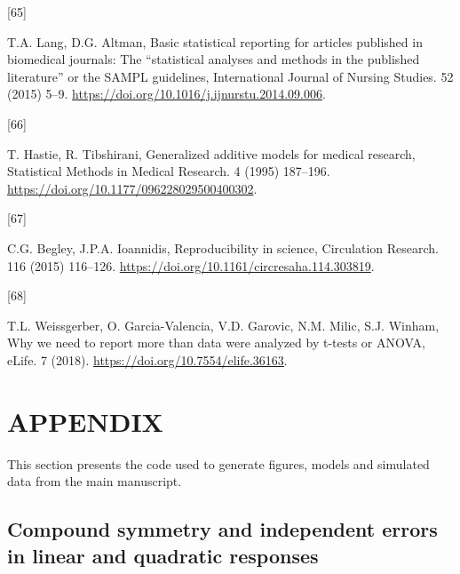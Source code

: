 \documentclass[
]{article}
\newlength{\cslhangindent}
\newlength{\csllabelwidth}
\newlength{\cslentryspacingunit} %
\newenvironment{CSLReferences}[2] %
 {%
  \setlength{\parindent}{0pt}
  \ifodd #1
  \let\oldpar\par
  \def\par{\hangindent=\cslhangindent\oldpar}
  \fi
  \setlength{\parskip}{#2\cslentryspacingunit}
 }%
 {}
\newcommand{\CSLLeftMargin}[1]{\parbox[t]{\csllabelwidth}{#1}}
\newcommand{\CSLRightInline}[1]{\parbox[t]{\linewidth - \csllabelwidth}{#1}\break}
\newcommand{\appendixpagenumbering}{
  \break
  \pagenumbering{arabic}
  \renewcommand{\thepage}{\thesection-\arabic{page}}
}
\begin{document}
\begin{CSLReferences}{0}{0}
\leavevmode{}%
\CSLLeftMargin{{[}65{]} }
\CSLRightInline{T.A. Lang, D.G. Altman, Basic statistical reporting for articles published in biomedical journals: The {``}statistical analyses and methods in the published literature{''} or the {SAMPL} guidelines, International Journal of Nursing Studies. 52 (2015) 5--9. \url{https://doi.org/10.1016/j.ijnurstu.2014.09.006}.}

\leavevmode{}%
\CSLLeftMargin{{[}66{]} }
\CSLRightInline{T. Hastie, R. Tibshirani, Generalized additive models for medical research, Statistical Methods in Medical Research. 4 (1995) 187--196. \url{https://doi.org/10.1177/096228029500400302}.}

\leavevmode{}%
\CSLLeftMargin{{[}67{]} }
\CSLRightInline{C.G. Begley, J.P.A. Ioannidis, Reproducibility in science, Circulation Research. 116 (2015) 116--126. \url{https://doi.org/10.1161/circresaha.114.303819}.}

\leavevmode{}%
\CSLLeftMargin{{[}68{]} }
\CSLRightInline{T.L. Weissgerber, O. Garcia-Valencia, V.D. Garovic, N.M. Milic, S.J. Winham, Why we need to report more than {\textquotesingle}data were analyzed by t-tests or {ANOVA}{\textquotesingle}, {eLife}. 7 (2018). \url{https://doi.org/10.7554/elife.36163}.}

\end{CSLReferences}

\hypertarget{appendix-appendix}{%
\appendix}


\appendixpagenumbering


\hypertarget{appendix}{%
\section{APPENDIX}\label{appendix}}

This section presents the code used to generate figures, models and simulated data from the main manuscript.

\hypertarget{compound-symmetry-and-independent-errors-in-linear-and-quadratic-responses}{%
\subsection{Compound symmetry and independent errors in linear and quadratic responses}\label{compound-symmetry-and-independent-errors-in-linear-and-quadratic-responses}}
\end{document}
